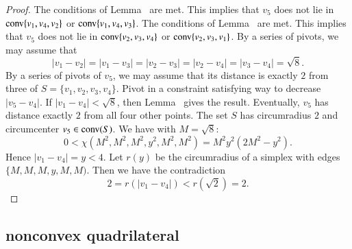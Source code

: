 \begin{tarskidata}
\begin{tarski}

\begin{proof}
The conditions of Lemma~ are met. This implies
that $v_5$ does not lie in ${\operatorname{conv}}\{v_1,v_4,v_2\}$ or
	${\operatorname{conv}}\{v_1,v_4,v_3\}$.
The conditions of Lemma~ are met.  This implies that
$v_5$ does not lie in ${\operatorname{conv}}\{v_2,v_3,v_4\}$ or
	${\operatorname{conv}}\{v_2,v_3,v_1\}$.
By a series of pivots, we may assume that
	$$|v_1-v_2|=|v_1-v_3|=|v_2-v_3|=|v_2-v_4|=|v_3-v_4|=\sqrt8.$$
By a series of pivots of $v_5$, we may assume that its distance is exactly
$2$ from three of $S=\{v_1,v_2,v_3,v_4\}$.  
Pivot in a constraint satisfying way to decrease $|v_5-v_4|$.
If $|v_1-v_4|<\sqrt8$, then Lemma~ %
gives the
result.
Eventually, $v_5$ has distance exactly $2$ from all four other points.
The set $S$ has circumradius $2$ and circumcenter $v_5\in{\operatorname{conv}}(S)$.  
	We have with $M=\sqrt8$:
	$$0 < \chi(M^2,M^2,M^2,y^2,M^2,M^2)= M^2 y^2 (2M^2 - y^2).$$
Hence $|v_1-v_4|=y < 4$.
Let $r(y)$ be the circumradius of a simplex with edges $\{M,M,M,y,M,M)$.
Then we have the contradiction
	$$2 = r(|v_1-v_4|) < r(\sqrt2) = 2.$$
\end{proof}
\end{tarski}












\begin{tarski}
\subsection{nonconvex quadrilateral}


\end{tarski}
\end{tarskidata}
